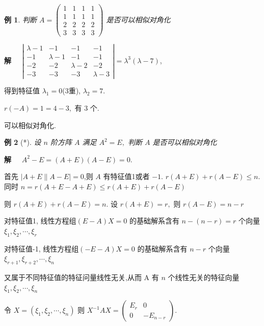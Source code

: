 \documentclass[13pt]{beamer}
\newtheorem{exa}{例}
\def\sol{{\bf 解~~ }}
\begin{document}
\begin{frame}
\begin{exa}
判断 $A=\left(\begin{array}{cccc}1 & 1 & 1 & 1 \\ 1 & 1 & 1 & 1 \\ 2 & 2 & 2 & 2 \\ 3 & 3 & 3 & 3\end{array}\right)$ 是否可以相似对角化
\end{exa} 
\sol 
$\left|\begin{array}{cccc}\lambda-1 & -1 & -1 & -1 \\ -1 & \lambda-1 & -1 & -1 \\ -2 & -2 & \lambda-2 & -2 \\ -3 & -3 & -3 & \lambda-3\end{array}\right| 
=\lambda^{3}(\lambda-7)$,

得到特征值 $\lambda_{1}=0$(3重), $\lambda_{2}=7$.

$r(-A)=1=4-3,$ 有 3 个.

可以相似对角化.
\end{frame}



\begin{frame}
\begin{exa}[*]
设 $n$ 阶方阵 $A$ 满足 $A^{2}=E,$ 判断 $A$ 是否可以相似对角化
\end{exa}
\sol $A^{2}-E=(A+E)(A-E)=0$.

首先 $|A+E \| A-E|=0$,则 $A$ 有特征值1或者 $-1 .$
$r(A+E)+r(A-E) \leq n$.同时 $n=r(A+E-A+E) \leq r(A+E)+r(A-E)$

则 $r(A+E)+r(A-E)=n .$ 设 $r(A+E)=r,$ 则 $r(A-E)=n-r$

对特征值1, 线性方程组$(E-A) X=0$ 的基础解系含有 $n-(n-r)=r$ 个向量 $\xi_{1}, \xi_{2}, \cdots, \xi_{r}$

对特征值-1, 线性方程组$(-E-A) X=0$ 的基础解系含有 $n-r$ 个向量 $\xi_{r+1}, \xi_{r+2}, \cdots, \xi_{n}$

又属于不同特征值的特征问量线性无关,从而 A 有 $n$ 个线性无关的特征向量 $\xi_{1}, \xi_{2}, \cdots, \xi_{n}$

令 $X=\left(\xi_{1}, \xi_{2}, \cdots, \xi_{n}\right)$ 则 $X^{-1} A X=\left(\begin{array}{cc}E_{r} & 0 \\ 0 & -E_{n-r}\end{array}\right).$
\end{frame}
\end{document}

